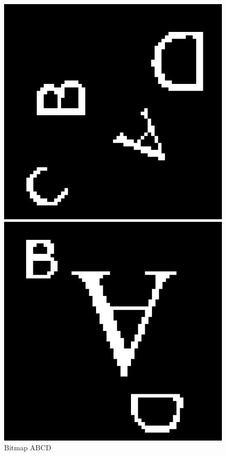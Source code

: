 \begin{figure}[!htb]
      \includegraphics[width=\linewidth]{figures/Bitmap-highvar-ABCD}
      \caption{Bitmap ABCD}
      \label{Bitmap-highvar-ABCD}
    \endminipage\hfill
      \includegraphics[width=\linewidth]{figures/Bitmap-highvar-ABD}

\end{figure}

